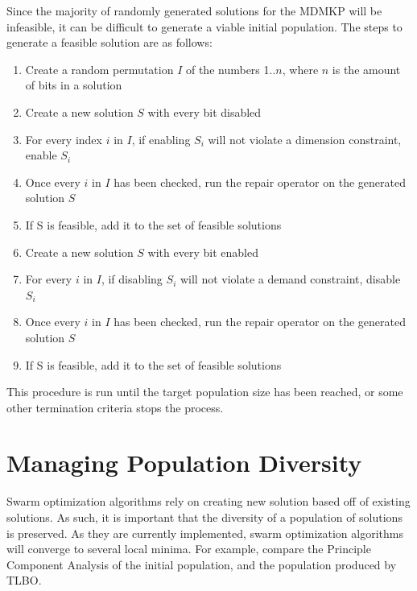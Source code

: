 \documentclass[11pt, letterpaper, onecolumn]{article}
\begin{document}
Since the majority of randomly generated solutions for the MDMKP will be infeasible, it can be difficult to generate a viable initial population. The steps to generate a feasible solution are as follows:

\begin{enumerate}
\item Create a random permutation $I$ of the numbers 1..$n$, where $n$ is the amount of bits in a solution
\item Create a new solution $S$ with every bit disabled
\item For every index $i$ in $I$, if enabling $S_i$ will not violate a dimension constraint, enable $S_i$
\item Once every $i$ in $I$ has been checked, run the repair operator on the generated solution $S$
\item If S is feasible, add it to the set of feasible solutions
\item Create a new solution $S$ with every bit enabled
\item For every $i$ in $I$, if disabling $S_i$ will not violate a demand constraint, disable $S_i$
\item Once every $i$ in $I$ has been checked, run the repair operator on the generated solution $S$
\item If S is feasible, add it to the set of feasible solutions
\end{enumerate}

This procedure is run until the target population size has been reached, or some other termination criteria stops the process. 

\section{Managing Population Diversity}

Swarm optimization algorithms rely on creating new solution based off of existing solutions. As such, it is important that the diversity of a population of solutions is preserved. As they are currently implemented, swarm optimization algorithms will converge to several local minima. For example, compare the Principle Component Analysis of the initial population, and the population produced by TLBO. 
\end{document}
